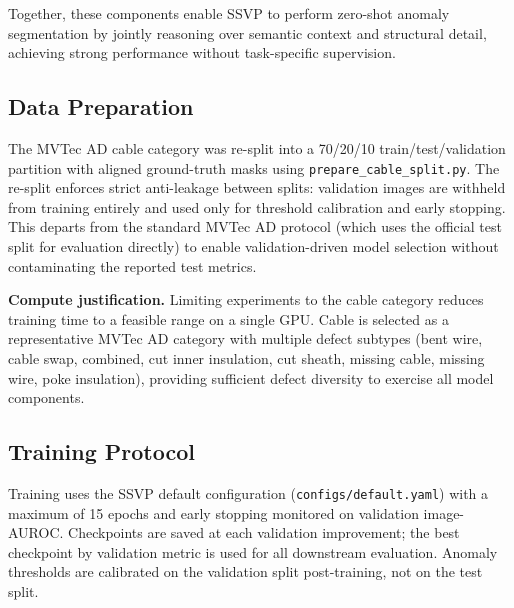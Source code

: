 \documentclass[11pt]{article}
\begin{document}
Together, these components enable SSVP to perform zero-shot anomaly segmentation by jointly reasoning over semantic context and structural detail, achieving strong performance without task-specific supervision.


\subsection{Data Preparation}

The MVTec AD cable category was re-split into a 70/20/10 train/test/validation
partition with aligned ground-truth masks using \texttt{prepare\_cable\_split.py}.
The re-split enforces strict anti-leakage between splits: validation images are
withheld from training entirely and used only for threshold calibration and early
stopping. This departs from the standard MVTec AD protocol (which uses the official
test split for evaluation directly) to enable validation-driven model selection
without contaminating the reported test metrics.

\textbf{Compute justification.} Limiting experiments to the cable category reduces
training time to a feasible range on a single GPU. Cable is selected as a
representative MVTec AD category with multiple defect subtypes (bent wire, cable
swap, combined, cut inner insulation, cut sheath, missing cable, missing wire,
poke insulation), providing sufficient defect diversity to exercise all model components.

\subsection{Training Protocol}

Training uses the SSVP default configuration (\texttt{configs/default.yaml}) with
a maximum of 15 epochs and early stopping monitored on validation image-AUROC.
Checkpoints are saved at each validation improvement; the best checkpoint by
validation metric is used for all downstream evaluation. Anomaly thresholds are
calibrated on the validation split post-training, not on the test split.


\end{document}

